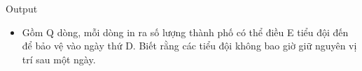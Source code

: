 Output
\begin{itemize}
	\item     Gồm Q dòng, mỗi dòng in ra số lượng thành phố có thể điều E tiểu đội đến để bảo vệ vào ngày thứ D. Biết rằng các tiểu đội không bao giờ giữ nguyên vị trí sau một ngày.   
\end{itemize}